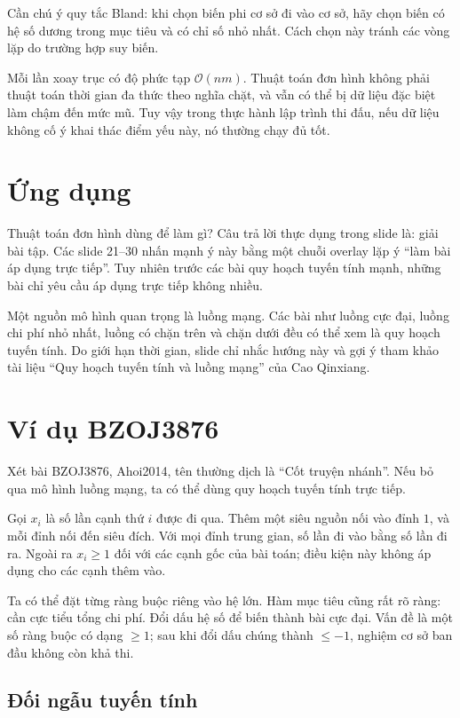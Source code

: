 \documentclass[11pt]{article}
\newcommand{\Oh}{\mathcal{O}}
\begin{document}
Cần chú ý quy tắc Bland: khi chọn biến phi cơ sở đi vào cơ sở, hãy chọn biến
có hệ số dương trong mục tiêu và có chỉ số nhỏ nhất. Cách chọn này tránh các
vòng lặp do trường hợp suy biến.

Mỗi lần xoay trục có độ phức tạp \(\Oh(nm)\). Thuật toán đơn hình không phải
thuật toán thời gian đa thức theo nghĩa chặt, và vẫn có thể bị dữ liệu đặc
biệt làm chậm đến mức mũ. Tuy vậy trong thực hành lập trình thi đấu, nếu dữ
liệu không cố ý khai thác điểm yếu này, nó thường chạy đủ tốt.

\section{Ứng dụng}

Thuật toán đơn hình dùng để làm gì? Câu trả lời thực dụng trong slide là:
giải bài tập. Các slide 21--30 nhấn mạnh ý này bằng một chuỗi overlay lặp
ý ``làm bài áp dụng trực tiếp''. Tuy nhiên trước các bài quy hoạch tuyến tính
mạnh, những bài chỉ yêu cầu áp dụng trực tiếp không nhiều.

Một nguồn mô hình quan trọng là luồng mạng. Các bài như luồng cực đại,
luồng chi phí nhỏ nhất, luồng có chặn trên và chặn dưới đều có thể xem là
quy hoạch tuyến tính. Do giới hạn thời gian, slide chỉ nhắc hướng này và
gợi ý tham khảo tài liệu ``Quy hoạch tuyến tính và luồng mạng'' của Cao
Qinxiang.

\section{Ví dụ BZOJ3876}

Xét bài BZOJ3876, Ahoi2014, tên thường dịch là ``Cốt truyện nhánh''. Nếu bỏ
qua mô hình luồng mạng, ta có thể dùng quy hoạch tuyến tính trực tiếp.

Gọi \(x_i\) là số lần cạnh thứ \(i\) được đi qua. Thêm một siêu nguồn nối
vào đỉnh \(1\), và mỗi đỉnh nối đến siêu đích. Với mọi đỉnh trung gian, số
lần đi vào bằng số lần đi ra. Ngoài ra \(x_i\ge 1\) đối với các cạnh gốc của
bài toán; điều kiện này không áp dụng cho các cạnh thêm vào.

Ta có thể đặt từng ràng buộc riêng vào hệ lớn. Hàm mục tiêu cũng rất rõ
ràng: cần cực tiểu tổng chi phí. Đổi dấu hệ số để biến thành bài cực đại.
Vấn đề là một số ràng buộc có dạng \(\ge 1\); sau khi đổi dấu chúng thành
\(\le -1\), nghiệm cơ sở ban đầu không còn khả thi.

\subsection{Đối ngẫu tuyến tính}
\end{document}
